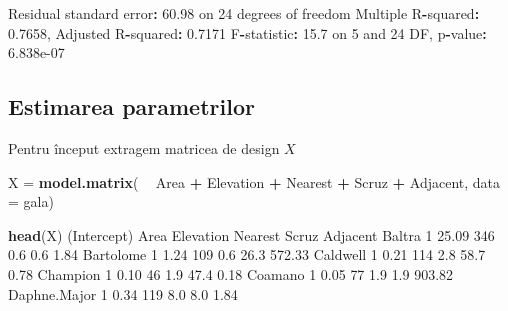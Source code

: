 \documentclass[]{article}
\newenvironment{Shaded}{\begin{snugshade}}{\end{snugshade}}
\newcommand{\KeywordTok}[1]{\textcolor[rgb]{0.13,0.29,0.53}{\textbf{#1}}}
\newcommand{\DataTypeTok}[1]{\textcolor[rgb]{0.13,0.29,0.53}{#1}}
\newcommand{\DecValTok}[1]{\textcolor[rgb]{0.00,0.00,0.81}{#1}}
\newcommand{\FloatTok}[1]{\textcolor[rgb]{0.00,0.00,0.81}{#1}}
\newcommand{\StringTok}[1]{\textcolor[rgb]{0.31,0.60,0.02}{#1}}
\newcommand{\OperatorTok}[1]{\textcolor[rgb]{0.81,0.36,0.00}{\textbf{#1}}}
\newcommand{\NormalTok}[1]{#1}
\begin{document}
\begin{Shaded}
\begin{Highlighting}[]
\NormalTok{Residual standard error}\OperatorTok{:}\StringTok{ }\FloatTok{60.98}\NormalTok{ on }\DecValTok{24}\NormalTok{ degrees of freedom}
\NormalTok{Multiple R}\OperatorTok{-}\NormalTok{squared}\OperatorTok{:}\StringTok{  }\FloatTok{0.7658}\NormalTok{,    Adjusted R}\OperatorTok{-}\NormalTok{squared}\OperatorTok{:}\StringTok{  }\FloatTok{0.7171} 
\NormalTok{F}\OperatorTok{-}\NormalTok{statistic}\OperatorTok{:}\StringTok{  }\FloatTok{15.7}\NormalTok{ on }\DecValTok{5}\NormalTok{ and }\DecValTok{24}\NormalTok{ DF,  p}\OperatorTok{-}\NormalTok{value}\OperatorTok{:}\StringTok{ }\FloatTok{6.838e-07}
\end{Highlighting}
\end{Shaded}

\subsection{Estimarea parametrilor}\label{estimarea-parametrilor}

Pentru început extragem matricea de design \(X\)

\begin{Shaded}
\begin{Highlighting}[]
\NormalTok{X =}\StringTok{ }\KeywordTok{model.matrix}\NormalTok{( }\OperatorTok{~}\StringTok{ }\NormalTok{Area }\OperatorTok{+}\StringTok{ }\NormalTok{Elevation }\OperatorTok{+}\StringTok{ }\NormalTok{Nearest }\OperatorTok{+}\StringTok{ }\NormalTok{Scruz }\OperatorTok{+}\StringTok{ }\NormalTok{Adjacent, }
    \DataTypeTok{data =}\NormalTok{ gala)}

\KeywordTok{head}\NormalTok{(X)}
\NormalTok{             (Intercept)  Area Elevation Nearest Scruz Adjacent}
\NormalTok{Baltra                 }\DecValTok{1} \FloatTok{25.09}       \DecValTok{346}     \FloatTok{0.6}   \FloatTok{0.6}     \FloatTok{1.84}
\NormalTok{Bartolome              }\DecValTok{1}  \FloatTok{1.24}       \DecValTok{109}     \FloatTok{0.6}  \FloatTok{26.3}   \FloatTok{572.33}
\NormalTok{Caldwell               }\DecValTok{1}  \FloatTok{0.21}       \DecValTok{114}     \FloatTok{2.8}  \FloatTok{58.7}     \FloatTok{0.78}
\NormalTok{Champion               }\DecValTok{1}  \FloatTok{0.10}        \DecValTok{46}     \FloatTok{1.9}  \FloatTok{47.4}     \FloatTok{0.18}
\NormalTok{Coamano                }\DecValTok{1}  \FloatTok{0.05}        \DecValTok{77}     \FloatTok{1.9}   \FloatTok{1.9}   \FloatTok{903.82}
\NormalTok{Daphne.Major           }\DecValTok{1}  \FloatTok{0.34}       \DecValTok{119}     \FloatTok{8.0}   \FloatTok{8.0}     \FloatTok{1.84}
\end{Highlighting}
\end{Shaded}
\end{document}
